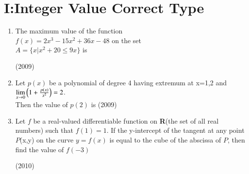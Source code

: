 \documentclass[journal,,12pt,twocolumn]{IEEEtran}
\theoremstyle{remark}
\begin{document}
\section*{I:Integer Value Correct Type}

\begin{enumerate}
\item The maximum value of the function \\
$f(x)=2x^3-15x^2+36x-48$ on the set\\
$A=\{x|x^2+20 \le 9x\}$ is

\hfill {(2009)}

\item Let $p(x)$ be a polynomial of degree 4 having extremum at x=1,2 and $\lim \limits_{x\to 0} \left(1+\frac{p(x)}{x^2}\right) = 2$.\\
Then the value of $p(2)$ is
\hfill{(2009)}
\item Let $f$ be a real-valued differentiable function on \textbf{R}(the set of all real numbers) such that $f(1)=1$. If the y-intercept of the tangent at any point $P$(x,y) on the curve $y=f(x)$ is equal to the cube of the abscissa of $P$, then find the value of $f(-3)$

    \hfill {(2010)}


\end{enumerate}
\end{document}
